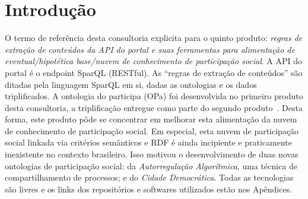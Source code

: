 \documentclass[12pt]{article}
\newcommand{\PalavrasChave}{reconhecimento de padrões, redes complexas, processamento de linguagem natural, web semântica, participação social}
\begin{document}



\tableofcontents
\newpage


\begin{abstract}
Este documento descreve a alimentação com dados do Participa.br da nuvem de conhecimento de participação social. Não havia dados participativos brasileiros linkados, então a nuvem foi iniciada com a especificação ontológica e triplificação dos dados de duas outras instâncias: do AA, um sistema de compartilhamento de processos usado por programadores e midialivristas; e do Cidade Democrática, um portal participativo capitaneado pela sociedade civil. A triplificação do Participa.br e sua ontológia (OPa) foram feitas no primeiro e segundo produtos desta consultoria. Este trabalho aponta melhoras nesta integração do Participa.br aos dados linkados, com revisão de algumas estruturas iniciadas nesta consultoria e com o fornecimento de contexto.
{\bf Palavras-chave:} \PalavrasChave.
\end{abstract}
\newpage

\section{Introdução}

O termo de referência desta consultoria explicita para o quinto produto: \emph{regras de extração de conteúdos da API do portal e suas ferramentas para alimentação de eventual/hipotética base/nuvem de conhecimento de participação social}. A API do portal é o endpoint SparQL (RESTful). As ``regras de extração de conteúdos'' são ditadas pela linguagem SparQL em si, dadas as ontologias e os dados triplificados. A ontologia do participa (OPa) foi desenvolvida no primeiro produto desta consultoria, a triplificação entregue como parte do segundo produto~\cite{repoProd1, repoProd2}. Desta forma, este produto pôde se concentrar em melhorar esta alimentação da nuvem de conhecimento de participação social. Em especial, esta nuvem de participação social linkada via critérios semânticos e RDF é ainda incipiente e praticamente inexistente no contexto brasileiro. Isso motivou o desenvolvimento de duas novas ontologias de participação social: da \emph{Autorregulação Algorítmica}, uma técnica de compartilhamento de processos; e do \emph{Cidade Democrática}. Todas as tecnologias são livres e os links dos repositórios e softwares utilizados estão nos Apêndices.
\end{document}
